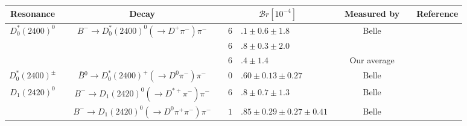 {\setlength\tabcolsep{0pt}
	\begin{tabular}{cp{5pt}cp{5pt}r@{}lp{5pt}cp{5pt}c}
		\toprule
		\rowcolor{Gray} Resonance&&Decay &&\multicolumn{2}{c}{$\mathcal{B}r[10^{-4}]$} & & \multicolumn{1}{c}{Measured by} &&  \multicolumn{1}{c}{Reference}
		\\ \midrule
		\multirow{3}{*}{$D_{0}^{*}(2400)^{0}$}       &   & \multirow{3}{*}{$B^{-}\to D_{0}^{*}(2400)^{0}(\to D^{+}\pi^{-})\pi^{-}$}                 &                       & $6$                                  & $.1\pm0.6\pm1.8$                                &                       & Belle                         &                       & \cite{Abe:2003zm}    \\ 
		                                             &   &                                                                                          &                       & $6$                                  & $.8\pm0.3\pm2.0$                                &                       & \babar{}                      &                       & \cite{Aubert:2009wg} \\  \cmidrule{4-9}
		                                             &   &                                                                                          & \cellcolor{Gray}      & \cellcolor{Gray}$6$                  & \cellcolor{Gray}$.4\pm 1.4$                     & \cellcolor{Gray}      & \cellcolor{Gray}  Our average & \cellcolor{Gray}      &                      \\ \midrule
		\multirow{1}{*}{$D_{0}^{*}(2400)^{\pm}$}     &   & \multirow{1}{*}{$\overline{B}{}^{0}\to D_{0}^{*}(2400)^{+}(\to D^{0}\pi^{-})\pi^{-}$}    & \cellcolor{LightGray} & \cellcolor{LightGray} $0$            & \cellcolor{LightGray}$.60\pm0.13\pm0.27$        & \cellcolor{LightGray} & \cellcolor{LightGray} Belle   & \cellcolor{LightGray} & \cite{Kuzmin:2006mw} \\	\midrule		
		\multirow{2}{*}{$D_{1}^{}(2420)^{0}$}        &   & \multirow{1}{*}{$B^{-}\to D_{1}^{}(2420)^{0}(\to D^{*+}\pi^{-})\pi^{-}$}                 & \cellcolor{LightGray} & \cellcolor{LightGray} $6$            & \cellcolor{LightGray}$.8\pm0.7\pm1.3$           & \cellcolor{LightGray} & \cellcolor{LightGray} Belle   & \cellcolor{LightGray} & \cite{Abe:2003zm}    \\	\cmidrule{4-9}
		                                             &   & \multirow{1}{*}{$B^{-}\to D_{1}^{}(2420)^{0}(\to D^{0}\pi^{+}\pi^{-})\pi^{-}$}           & \cellcolor{LightGray} & \cellcolor{LightGray} $1$            & \cellcolor{LightGray}$.85\pm0.29\pm0.27\pm0.41$ & \cellcolor{LightGray} & \cellcolor{LightGray} Belle   & \cellcolor{LightGray} & \cite{Abe:2004sm}    \\	\midrule					

\end{tabular}}
